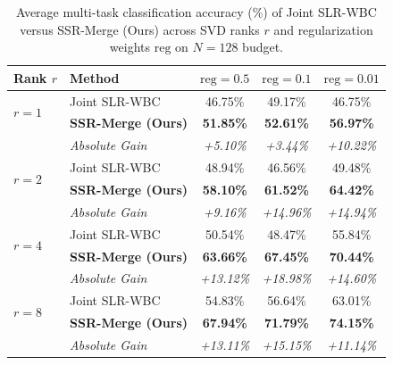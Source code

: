 \documentclass{article}
\theoremstyle{plain}
\theoremstyle{definition}
\theoremstyle{remark}
\begin{document}
\begin{table}[H]
\caption{Average multi-task classification accuracy (\%) of Joint SLR-WBC versus SSR-Merge (Ours) across SVD ranks $r$ and regularization weights $\text{reg}$ on $N=128$ budget.}
\label{tab:joint_vs_routed_grid}
\vskip 0.15in
\begin{center}
\begin{small}
\begin{tabular}{llccc}
\toprule
Rank $r$ & Method & $\text{reg} = 0.5$ & $\text{reg} = 0.1$ & $\text{reg} = 0.01$ \\
\midrule
\multirow{2}{*}{$r=1$} 
& Joint SLR-WBC & 46.75\% & 49.17\% & 46.75\% \\
& \textbf{SSR-Merge (Ours)} & \textbf{51.85\%} & \textbf{52.61\%} & \textbf{56.97\%} \\
& \textit{Absolute Gain} & \textit{+5.10\%} & \textit{+3.44\%} & \textit{+10.22\%} \\
\midrule
\multirow{2}{*}{$r=2$} 
& Joint SLR-WBC & 48.94\% & 46.56\% & 49.48\% \\
& \textbf{SSR-Merge (Ours)} & \textbf{58.10\%} & \textbf{61.52\%} & \textbf{64.42\%} \\
& \textit{Absolute Gain} & \textit{+9.16\%} & \textit{+14.96\%} & \textit{+14.94\%} \\
\midrule
\multirow{2}{*}{$r=4$} 
& Joint SLR-WBC & 50.54\% & 48.47\% & 55.84\% \\
& \textbf{SSR-Merge (Ours)} & \textbf{63.66\%} & \textbf{67.45\%} & \textbf{70.44\%} \\
& \textit{Absolute Gain} & \textit{+13.12\%} & \textit{+18.98\%} & \textit{+14.60\%} \\
\midrule
\multirow{2}{*}{$r=8$} 
& Joint SLR-WBC & 54.83\% & 56.64\% & 63.01\% \\
& \textbf{SSR-Merge (Ours)} & \textbf{67.94\%} & \textbf{71.79\%} & \textbf{74.15\%} \\
& \textit{Absolute Gain} & \textit{+13.11\%} & \textit{+15.15\%} & \textit{+11.14\%} \\
\bottomrule
\end{tabular}
\end{small}
\end{center}
\end{table}
\end{document}
